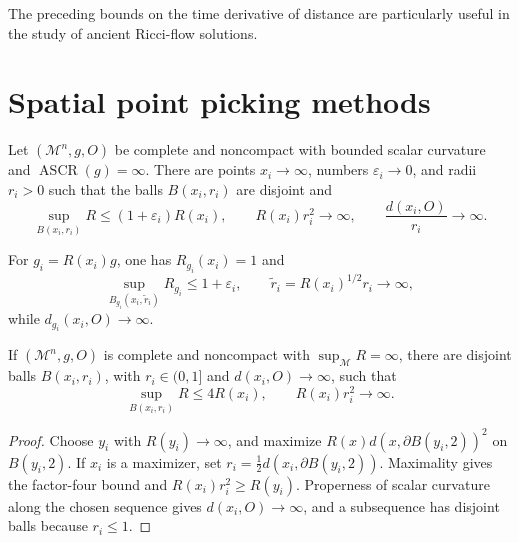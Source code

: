 \begin{remark}
\label{rem:chow-iii-changing-distances-ancient-solutions}
The preceding bounds on the time derivative of distance are particularly
useful in the study of ancient Ricci-flow solutions.
\end{remark}

\section{Spatial point picking methods}

\begin{theorem}
\label{thm:chow-iii-point-picking-infinite-ascr}
Let \((\mathcal M^n,g,O)\) be complete and noncompact with bounded scalar
curvature and \(\operatorname{ASCR}(g)=\infty\).  There are points
\(x_i\to\infty\), numbers \(\varepsilon_i\to0\), and radii \(r_i>0\) such
that the balls \(B(x_i,r_i)\) are disjoint and
\[
 \sup_{B(x_i,r_i)}R\le(1+\varepsilon_i)R(x_i),\qquad
 R(x_i)r_i^2\to\infty,\qquad \frac{d(x_i,O)}{r_i}\to\infty.
\]
\end{theorem}

\begin{remark}
\label{rem:chow-iii-rescaled-point-picked-balls}
For \(g_i=R(x_i)g\), one has \(R_{g_i}(x_i)=1\) and
\[
 \sup_{B_{g_i}(x_i,\widetilde r_i)}R_{g_i}\le1+\varepsilon_i,
 \qquad \widetilde r_i=R(x_i)^{1/2}r_i\to\infty,
\]
while \(d_{g_i}(x_i,O)\to\infty\).
\end{remark}

\begin{proposition}
\label{prop:chow-iii-unbounded-curvature-point-picking-one}
If \((\mathcal M^n,g,O)\) is complete and noncompact with
\(\sup_{\mathcal M} R=\infty\), there are disjoint balls \(B(x_i,r_i)\), with
\(r_i\in(0,1]\) and \(d(x_i,O)\to\infty\), such that
\[
 \sup_{B(x_i,r_i)}R\le4R(x_i),\qquad R(x_i)r_i^2\to\infty.
\]
\end{proposition}
\begin{proof}
\sketch Choose \(y_i\) with \(R(y_i)\to\infty\), and maximize
\(R(x)d(x,\partial B(y_i,2))^2\) on \(B(y_i,2)\).  If \(x_i\) is a maximizer,
set \(r_i=\frac12d(x_i,\partial B(y_i,2))\).  Maximality gives the factor-four
bound and \(R(x_i)r_i^2\ge R(y_i)\).  Properness of scalar curvature along the
chosen sequence gives \(d(x_i,O)\to\infty\), and a subsequence has disjoint
balls because \(r_i\le1\).
\end{proof}


